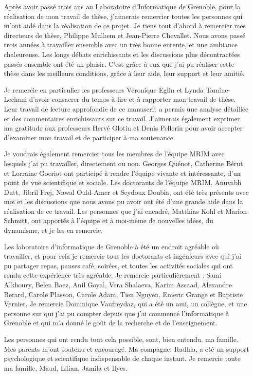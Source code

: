 
Après avoir passé trois ans au Laboratoire d'Informatique de Grenoble, pour la réalisation de mon travail de thèse, j'aimerais remercier toutes les personnes qui m'ont aidé dans la réalisation de ce projet.
Je tiens tout d'abord à remercier mes directeurs de thèse, Philippe Mulhem et Jean-Pierre Chevallet. 
Nous avons passé trois années à travailler ensemble avec un très bonne entente, et une ambiance chaleureuse. 
Les longs débats enrichissants et les discussions plus décontractées passés ensemble ont été un plaisir.
C'est grâce à eux que j'ai pu réaliser cette thèse dans les meilleurs conditions, grâce à leur aide, leur support et leur amitié.

Je remercie en particulier les professeurs Véronique Eglin et Lynda Tamine-Lechani d'avoir consacrer du temps à lire et à rapporter mon travail de thèse.
Leur travail de lecture approfondie de ce manuscrit a permis une analyse détaillée et des commentaires enrichissants sur ce travail. 
J'aimerais également exprimer ma gratitude aux professeurs Hervé Glotin et Denis Pellerin pour avoir accepter d'examiner mon travail et de participer à ma soutenance.

Je voudrais également remercier tous les membres de l'équipe MRIM avec lesquels j'ai pu travailler, directement ou non. Georges Quénot, Catherine Bérut et Lorraine Goeriot ont participé à rendre l'équipe vivante et intéressante, d'un point de vue scientifique et sociale.
Les doctorants de l'équipe MRIM, Anuvabh Dutt, Jibril Frej, Nawal Ould-Amer et Seydoux Doubia, ont été très présents avec moi et les discussions que nous avons pu avoir ont été d'une grande aide dans la réalisation de ce travail.
Les personnes que j'ai encadré, Matthias Kohl et Marion Schmitt, ont apportés à l'équipe et à moi-même de nouvelles idées, du dynamisme, et je les en remercie.

Les laboratoire d'informatique de Grenoble à été un endroit agréable où travailler, et pour cela je remercie tous les doctorants et ingénieurs avec qui j'ai pu partager repas, pauses café, soirées, et toutes les activités sociales qui ont rendu cette expérience très agréable.
Je remercie particulièrement : Sami Alkhoury, Belen Baez, Anil Goyal, Vera Shalaeva, Karim Assaad, Alexandre Berard, Carole Plasson, Carole Adam, Tien Nguyen, Emeric Grange et Baptiste Vernier. 
Je remercie Dominique Vaufreydaz, qui a été un ami, un collègue, et une personne sur qui j'ai pu compter depuis que j'ai commencé l'informatique à Grenoble et qui m'a donné le goût de la recherche et de l'enseignement.

Les personnes qui ont rendu tout cela possible, sont, bien entendu, ma famille. Mes parents m'ont soutenu et encouragé. Ma compagne, Radhia, a été un support psychologique et scientifique indispensable de chaque instant. Je remercie toute ma famille, Maud, Lilian, Jamila et Ilyes. 
